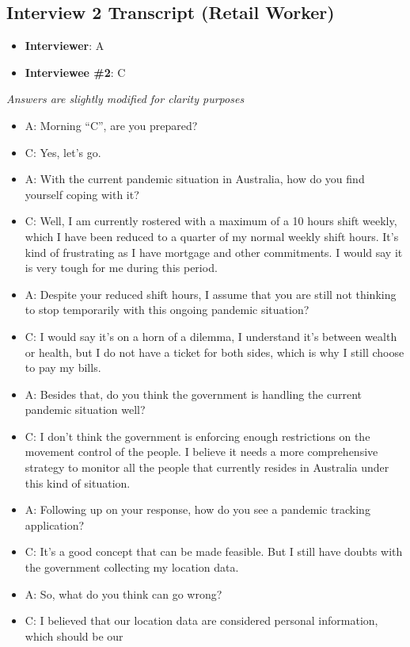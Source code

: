   \subsection{Interview 2 Transcript (Retail Worker)}
  \begin{itemize}
    \item \textbf{Interviewer}: A
    \item \textbf{Interviewee \#2}: C
  \end{itemize}
  \par \textit{Answers are slightly modified for clarity purposes}

  \begin{itemize}
    \item A: Morning “C”, are you prepared?
    \item C: Yes, let’s go.
    \item A: With the current pandemic situation in Australia, how do you find yourself coping with it?
    \item C: Well, I am currently rostered with a maximum of a 10 hours shift weekly, which I have been
    reduced to a quarter of my normal weekly shift hours. It’s kind of frustrating as I have
    mortgage and other commitments. I would say it is very tough for me during this period.
    \item A: Despite your reduced shift hours, I assume that you are still not thinking to stop temporarily
    with this ongoing pandemic situation?
    \item C: I would say it’s on a horn of a dilemma, I understand it’s between wealth or health, but I do
    not have a ticket for both sides, which is why I still choose to pay my bills.
    \item A: Besides that, do you think the government is handling the current pandemic situation well?
    \item C: I don’t think the government is enforcing enough restrictions on the movement control of the
    people. I believe it needs a more comprehensive strategy to monitor all the people that
    currently resides in Australia under this kind of situation.
    \item A: Following up on your response, how do you see a pandemic tracking application?
    \item C: It’s a good concept that can be made feasible. But I still have doubts with the government
    collecting my location data.
    \item A: So, what do you think can go wrong?
    \item C: I believed that our location data are considered personal information, which should be our

\end{itemize}
